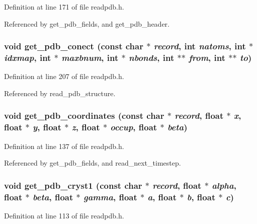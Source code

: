Definition at line 171 of file readpdb.h.

Referenced by get\_\-pdb\_\-fields, and get\_\-pdb\_\-header.
\subsubsection{\setlength{\rightskip}{0pt plus 5cm}void get\_\-pdb\_\-conect (const char $\ast$ {\em record}, int {\em natoms}, int $\ast$ {\em idxmap}, int $\ast$ {\em maxbnum}, int $\ast$ {\em nbonds}, int $\ast$$\ast$ {\em from}, int $\ast$$\ast$ {\em to})\hspace{0.3cm}{\tt  [static]}}\label{readpdb_8h_a16}




Definition at line 207 of file readpdb.h.

Referenced by read\_\-pdb\_\-structure.
\subsubsection{\setlength{\rightskip}{0pt plus 5cm}void get\_\-pdb\_\-coordinates (const char $\ast$ {\em record}, float $\ast$ {\em x}, float $\ast$ {\em y}, float $\ast$ {\em z}, float $\ast$ {\em occup}, float $\ast$ {\em beta})\hspace{0.3cm}{\tt  [static]}}\label{readpdb_8h_a13}




Definition at line 137 of file readpdb.h.

Referenced by get\_\-pdb\_\-fields, and read\_\-next\_\-timestep.
\subsubsection{\setlength{\rightskip}{0pt plus 5cm}void get\_\-pdb\_\-cryst1 (const char $\ast$ {\em record}, float $\ast$ {\em alpha}, float $\ast$ {\em beta}, float $\ast$ {\em gamma}, float $\ast$ {\em a}, float $\ast$ {\em b}, float $\ast$ {\em c})\hspace{0.3cm}{\tt  [static]}}\label{readpdb_8h_a12}




Definition at line 113 of file readpdb.h.

